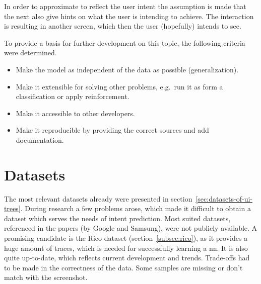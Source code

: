 In order to approximate to reflect the user intent the assumption is made that the next  also give hints on what the user is intending to achieve.
The interaction is resulting in another screen, which then the user (hopefully) intends to see.


To provide a basis for further development on this topic, the following criteria were determined.
\begin{itemize}
  \item Make the model as independent of the data as possible (generalization).
  \item Make it extensible for solving other problems, e.g.\ run it as form a classification or apply reinforcement.
  \item Make it accessible to other developers.
  \item Make it reproducible by providing the correct sources and add documentation.
\end{itemize}


\section{Datasets}

The most relevant datasets already were presented in section~\ref{sec:datasets-of-ui-trees}.
During research a few problems arose, which made it difficult to obtain a dataset which serves the needs of intent prediction.
Most suited datasets, referenced in the papers (by Google and Samsung), were not publicly available.
A promising candidate is the Rico dataset (section~\ref{subsec:rico}), as it provides a huge amount of traces, which is needed for successfully learning a \gls{nn}.
It is also quite up-to-date, which reflects current development and trends.
Trade-offs had to be made in the correctness of the data.
Some samples are missing or don't match with the screenshot.

